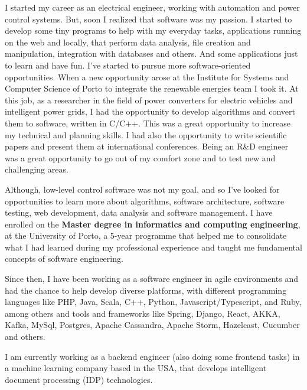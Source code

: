 \documentclass[letterpaper,11pt]{article}
\newlength{\outerbordwidth}
\newcommand{\resheading}[1]{\vspace{4pt}
  \parbox{\textwidth}{\setlength{\FrameSep}{\outerbordwidth}
    \begin{shaded}
\setlength{\fboxsep}{0pt}\framebox[\textwidth][l]{\setlength{\fboxsep}{4pt}\fcolorbox{shadecolorB}{shadecolorB}{\textbf{\sffamily{\mbox{~}\makebox[6.762in][l]{\large #1} \vphantom{p\^{E}}}}}}
    \end{shaded}
  }\vspace{4pt}
}
\newcommand{\cvevent}[1]{\vspace{5pt}
  \parbox{\textwidth}{\setlength{\FrameSep}{\outerbordwidth}
    \begin{shaded}
        \setlength{\fboxsep}{0pt}{\setlength{\fboxsep}{4pt}\fcolorbox{sectcol}{sectcol}{\textbf{\sffamily{\mbox{~}\makebox[6.762in][l]{\textcolor{white}{\large \uppercase{#1}}} \vphantom{p\^{E}}}}}}
    \end{shaded}
  }\vspace{40pt}
}
\begin{document}
\vspace{0.2in}		%


\resheading{\faUser\hspace{4pt}Summary}
\begin{center}
	\parbox{6.762in}{I started my career as an electrical engineer, working with automation and power control systems. But, soon I realized that software was my passion. I started to develop some tiny programs to help with my everyday tasks, applications running on the web and locally, that perform data analysis, file creation and manipulation, integration with databases and others. And some applications just to learn and have fun. I've started to pursue more software-oriented opportunities. When a new opportunity arose at the Institute for Systems and Computer Science of Porto to integrate the renewable energies team I took it. At this job, as a researcher in the field of power converters for electric vehicles and intelligent power grids, I had the opportunity to develop algorithms and convert them to software, written in C/C++. This was a great opportunity to increase my technical and planning skills. I had also the opportunity to write scientific papers and present them at international conferences. Being an R\&D engineer was a great opportunity to go out of my comfort zone and to test new and challenging areas.
	\linebreak
	
	Although, low-level control software was not my goal, and so I've looked for opportunities to learn more about algorithms, software architecture, software testing, web development, data analysis and software management. I have enrolled on the \textbf{Master degree in informatics and computing engineering}, at the University of Porto, a 5-year programme that helped me to consolidate what I had learned during my professional experience and taught me fundamental concepts of software engineering. 
	\linebreak
	
	Since then, I have been working as a software engineer in agile environments and had the chance to help develop diverse platforms, with different programming languages like PHP, Java, Scala, C++, Python, Javascript/Typescript, and Ruby, among others and tools and frameworks like Spring, Django, React, AKKA, Kafka, MySql, Postgres, Apache Cassandra, Apache Storm, Hazelcast, Cucumber and others.
	\linebreak
	
	I am currently working as a backend engineer (also doing some frontend tasks) in a machine learning company based in the USA, that develops intelligent document processing (IDP) technologies.}
\end{center}
\end{document}
